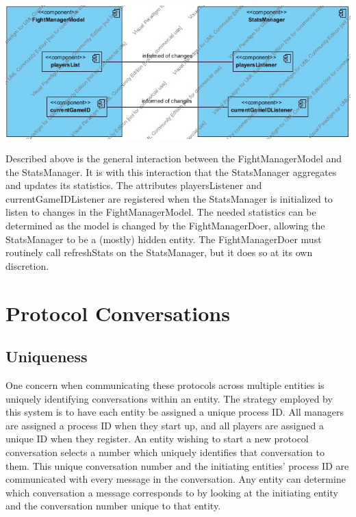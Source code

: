 \documentclass[12pt]{article}
\begin{document}
			\begin{center}
				\includegraphics[width=\textwidth]{Diagrams/Structure Diagrams/ComponentDiagram2.jpg}
			\end{center}
			Described above is the general interaction between the FightManagerModel and the StatsManager. It is with this interaction that the StatsManager aggregates and updates its statistics. The attributes playersListener and currentGameIDListener are registered when the StatsManager is initialized to listen to changes in the FightManagerModel. The needed statistics can be determined as the model is changed by the FightManagerDoer, allowing the StatsManager to be a (mostly) hidden entity. The FightManagerDoer must routinely call refreshStats on the StatsManager, but it does so at its own discretion.
\section{Protocol Conversations}
	\subsection{Uniqueness}
		One concern when communicating these protocols across multiple entities is uniquely identifying conversations within an entity. The strategy employed by this system is to have each entity be assigned a unique process ID. All managers are assigned a process ID when they start up, and all players are assigned a unique ID when they register. An entity wishing to start a new protocol conversation selects a number which uniquely identifies that conversation to them. This unique conversation number and the initiating entities' process ID are communicated with every message in the conversation. Any entity can determine which conversation a message corresponds to by looking at the initiating entity and the conversation number unique to that entity.
\end{document}
